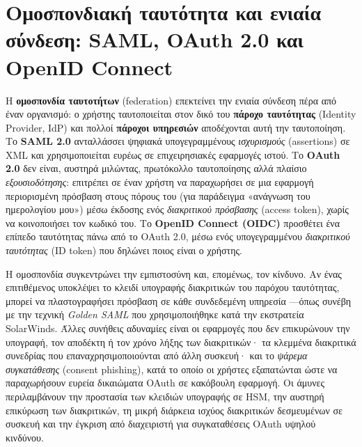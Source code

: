 \documentclass[11pt,openany]{book}
\begin{document}
\section{Ομοσπονδιακή ταυτότητα και ενιαία σύνδεση: SAML, OAuth 2.0 και OpenID Connect}\label{sec:8.6}
Η \textbf{ομοσπονδία ταυτοτήτων} (federation) επεκτείνει την ενιαία σύνδεση πέρα από έναν οργανισμό: ο χρήστης ταυτοποιείται στον δικό του \textbf{πάροχο ταυτότητας} (Identity Provider, IdP) και πολλοί \textbf{πάροχοι υπηρεσιών} αποδέχονται αυτή την ταυτοποίηση. Το \textbf{SAML 2.0} ανταλλάσσει ψηφιακά υπογεγραμμένους \emph{ισχυρισμούς} (assertions) σε XML και χρησιμοποιείται ευρέως σε επιχειρησιακές εφαρμογές ιστού. Το \textbf{OAuth 2.0} δεν είναι, αυστηρά μιλώντας, πρωτόκολλο ταυτοποίησης αλλά πλαίσιο \emph{εξουσιοδότησης}: επιτρέπει σε έναν χρήστη να παραχωρήσει σε μια εφαρμογή περιορισμένη πρόσβαση στους πόρους του (για παράδειγμα «ανάγνωση του ημερολογίου μου») μέσω έκδοσης ενός \emph{διακριτικού πρόσβασης} (access token), χωρίς να κοινοποιήσει τον κωδικό του. Το \textbf{OpenID Connect (OIDC)} προσθέτει ένα επίπεδο ταυτότητας πάνω από το OAuth 2.0, μέσω ενός υπογεγραμμένου \emph{διακριτικού ταυτότητας} (ID token) που δηλώνει ποιος είναι ο χρήστης.

Η ομοσπονδία συγκεντρώνει την εμπιστοσύνη και, επομένως, τον κίνδυνο. Αν ένας επιτιθέμενος υποκλέψει το κλειδί υπογραφής διακριτικών του παρόχου ταυτότητας, μπορεί να πλαστογραφήσει πρόσβαση σε κάθε συνδεδεμένη υπηρεσία —όπως συνέβη με την τεχνική \emph{Golden SAML} που χρησιμοποιήθηκε κατά την εκστρατεία SolarWinds. Άλλες συνήθεις αδυναμίες είναι οι εφαρμογές που δεν επικυρώνουν την υπογραφή, τον αποδέκτη ή τον χρόνο λήξης των διακριτικών· τα κλεμμένα διακριτικά συνεδρίας που επαναχρησιμοποιούνται από άλλη συσκευή· και το \emph{ψάρεμα συγκατάθεσης} (consent phishing), κατά το οποίο οι χρήστες εξαπατώνται ώστε να παραχωρήσουν ευρεία δικαιώματα OAuth σε κακόβουλη εφαρμογή. Οι άμυνες περιλαμβάνουν την προστασία των κλειδιών υπογραφής σε HSM, την αυστηρή επικύρωση των διακριτικών, τη μικρή διάρκεια ισχύος διακριτικών δεσμευμένων σε συσκευή και την έγκριση από διαχειριστή για συγκαταθέσεις OAuth υψηλού κινδύνου.
\end{document}
